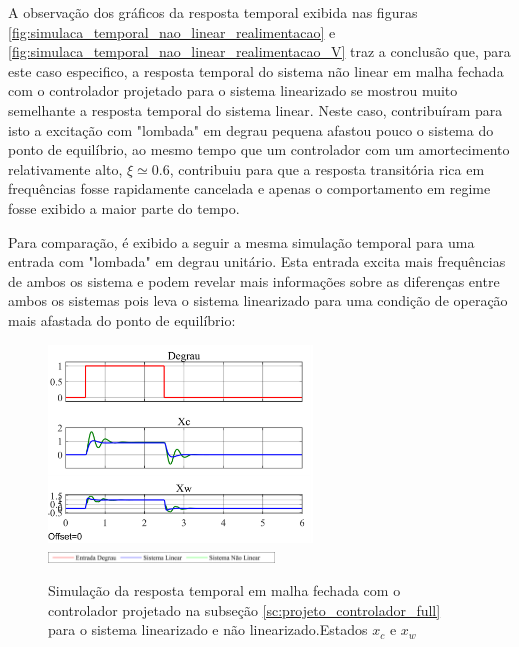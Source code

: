 \documentclass[a4paper]{ifacconf}
\begin{document}
    A observação dos gráficos da resposta temporal exibida nas figuras \ref{fig:simulaca_temporal_nao_linear_realimentacao} e \ref{fig:simulaca_temporal_nao_linear_realimentacao_V} traz a conclusão que, para este caso especifico, a resposta temporal do sistema não linear em malha fechada com o controlador projetado para o sistema linearizado se mostrou muito semelhante a resposta temporal do sistema linear. Neste caso, contribuíram para isto a excitação com "lombada" em degrau pequena afastou pouco o sistema do ponto de equilíbrio, ao mesmo tempo que um controlador com um amortecimento relativamente alto, $\xi \simeq 0.6$, contribuiu para que a resposta transitória rica em frequências fosse rapidamente cancelada e apenas o comportamento em regime fosse exibido a maior parte do tempo.
    
    Para comparação, é exibido a seguir a mesma simulação temporal para uma entrada com "lombada" em degrau unitário. Esta entrada excita mais frequências de ambos os sistema e podem revelar mais informações sobre as diferenças entre ambos os sistemas pois leva o sistema linearizado para uma condição de operação mais afastada do ponto de equilíbrio: 
    
    \FloatBarrier
    \begin{figure}[htbp]
        \begin{centering}
            \includegraphics[width=7cm]{img/simulaca_temporal_nao_linear_realimentacao_unit.png}
            \includegraphics[width=6cm]{img/sim_nao_linear_simulink_temp_leg.png}
            \caption{Simulação da resposta temporal em malha fechada com o controlador projetado na subseção \ref{sc:projeto_controlador_full} para o sistema linearizado e não linearizado.Estados $x_c$ e $x_w$ }
            \label{fig:simulaca_temporal_nao_linear_realimentacao_unit}
        \end{centering}
    \end{figure}
    \FloatBarrier
	
\end{document}
